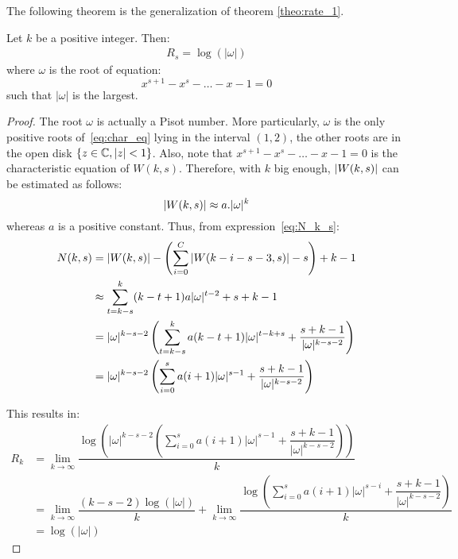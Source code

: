 The following theorem is the generalization of theorem \ref{theo:rate_1}.
\begin{theorem}\label{theo:rate_s}
    Let $k$ be a positive integer. Then:
    \begin{align}
        R_{s} = \log(\lvert\omega\rvert)
    \end{align}
    where $\omega$ is the root of equation: %
    \begin{equation}
        x^{s+1}-x^{s}-\ldots-x-1 = 0\label{eq:char_eq}
    \end{equation}
    such that $\lvert\omega\rvert$ is the largest.
\end{theorem}
\begin{proof}
    
    The root $\omega$ is actually a Pisot number. More particularly, $\omega$ is the only positive roots of~\ref{eq:char_eq} lying in the interval $(1,2)$, the other roots are in the open disk $\left\{z\in\mathbb{C},\left \lvert z \right \rvert<1\right\}$. Also, note that $x^{s+1}-x^{s}-\ldots-x-1=0$ is the characteristic equation of $W(k,s)$. Therefore, with $k$ big enough, $\left \lvert W(k,s) \right \rvert$ can be estimated as follows: \[\left \lvert W(k,s) \right \rvert \approx a.\lvert\omega\rvert^{k}\] whereas $a$ is a positive constant. Thus, from expression~\ref{eq:N_k_s}:
    \begin{align*}
        N(k,s) &= \left \lvert  W(k,s) \right \rvert - \left(\sum_{i=0}^{C}\left \lvert  W(k-i-s-3,s) \right \rvert - s\right) + k - 1 \\
        &\approx \sum_{t=k-s}^{k}(k-t+1)a\lvert\omega\rvert^{t-2} + s + k - 1\\
        &= \lvert\omega\rvert^{k-s-2}\left( \sum_{t=k-s}^{k}a(k-t+1)\lvert\omega\rvert^{t-k+s} + \dfrac{s+k-1}{\lvert\omega\rvert^{k-s-2}}\right)\\
        &= \lvert\omega\rvert^{k-s-2}\left( \sum_{i=0}^{s}a(i+1)\lvert\omega\rvert^{s-1} + \dfrac{s+k-1}{\lvert\omega\rvert^{k-s-2}}\right) 
    \end{align*}

    This results in:
    \begin{align*}
        R_{k} &= \lim_{k\to\infty}\dfrac{\log\left( \lvert\omega\rvert^{k-s-2}\left(\sum_{i=0}^{s}a(i+1)\lvert\omega\rvert^{s-1}+\dfrac{s+k-1}{\lvert\omega\rvert^{k-s-2}}\right)\right)}{k} \\
        &= \lim_{k\to\infty}\dfrac{(k-s-2)\log(\lvert\omega\rvert)}{k} + \lim_{k\to\infty}\dfrac{\log\left(\sum_{i=0}^{s}a(i+1)\lvert\omega\rvert^{s-i}+\dfrac{s+k-1}{\lvert\omega\rvert^{k-s-2}}\right)}{k}\\
        &= \log(\lvert\omega\rvert)
    \end{align*}
    
\end{proof}
